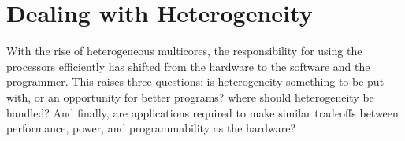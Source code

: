 \section{Dealing with Heterogeneity}

With the rise of heterogeneous multicores, the responsibility
for using the processors efficiently has shifted from the hardware
to the software and the programmer. This raises three questions:
is heterogeneity something to be put with, or an opportunity for
better programs? where should heterogeneity be handled? And finally,
are applications required to make similar tradeoffs between
performance, power, and programmability as the hardware? 

